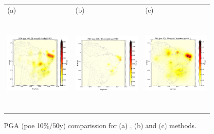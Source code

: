 \documentclass[draft, grl]{agutex}
\begin{document}
\begin{figure}
	\begin{center}
	\begin{table}[H]
		\begin{tabular}{ p{}
						 p{}
						 p{} }
		\footnotesize(a) &
		\footnotesize(b) &
		\footnotesize(c)
		\\
		\includegraphics[height=5cm]{z_img_pga_frankel}  &
		\includegraphics[height=5cm]{z_img_pga_woo} &
		\includegraphics[height=5cm]{z_img_pga_helmstetter}
		\end{tabular}
	\end{table}
	\caption{PGA (poe 10\%/50y) comparission for (a) \citet{frankel_1995}, (b) \citet{woo_1996} and (c) \citet{helmstetter_2012} methods.}
	\label{fig_pga}
	\end{center}
\end{figure}
\end{document}
